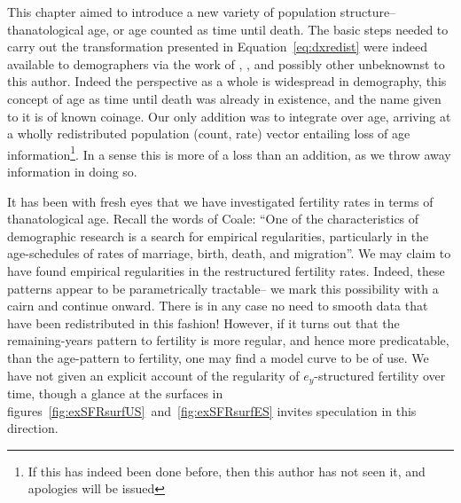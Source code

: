 \FloatBarrier

This chapter aimed to introduce a new variety of population structure--
thanatological age, or age counted as time until death. The basic steps needed
to carry out the transformation presented in Equation~\ref{eq:dxredist} were
indeed available to demographers via the work of
\citet{miller2001increasing}, \citet{lee2002approach}, \citet{vaupel2009life}
and possibly other unbeknownst to this author. Indeed the perspective as a
whole is widespread in demography, this concept of age as time until death
was already in existence, and the name given to it is of known coinage. Our only
addition was to integrate over age, arriving at a wholly 
redistributed population (count, rate) vector entailing loss of age
information\footnote{If this has indeed been done before, then this author has
not seen it, and apologies will be issued}. In a sense this is more of a loss than an addition,
as we throw away information in doing so. 

It has been with fresh eyes that we have investigated fertility rates in terms
of thanatological age. Recall the words of Coale:
``One of the characteristics of demographic research is a search for empirical regularities, particularly in the
age-schedules of rates of marriage, birth, death, and
migration''\citep{coale1996development}. We may claim to have found
empirical regularities in the restructured fertility rates. Indeed, these
patterns appear to be parametrically tractable-- we mark this possibility with
a cairn and continue onward. There is in any case no need to smooth data that
have been redistributed in this fashion! However, if it turns out that the
remaining-years pattern to fertility is more regular, and hence more
predicatable, than the age-pattern to fertility, one may find a model curve to
be of use. We have not given an explicit account of the regularity of
$e_y$-structured fertility over time, though a glance at the surfaces in
figures~\ref{fig:exSFRsurfUS}~and~\ref{fig:exSFRsurfES} invites speculation in
this direction.

